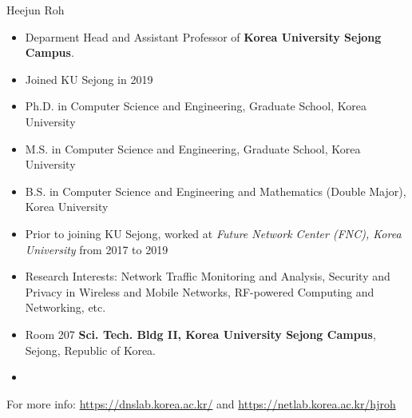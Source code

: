 \begin{frame}{Heejun Roh}
  \begin{itemize}
  \item Deparment Head and Assistant Professor of {\bf Korea University Sejong Campus}.
  \item Joined KU Sejong in 2019
  \item Ph.D. in Computer Science and Engineering, Graduate School, Korea University
  \item M.S. in Computer Science and Engineering, Graduate School, Korea University
  \item B.S. in Computer Science and Engineering and Mathematics (Double Major), Korea University
  \item Prior to joining KU Sejong, worked at {\em Future Network Center (FNC), Korea University} from 2017 to
    2019
  \item Research Interests: Network Traffic Monitoring and Analysis, Security and Privacy in Wireless and Mobile Networks, RF-powered Computing and Networking, etc.
  \item Room 207 {\bf Sci. Tech. Bldg II, Korea University Sejong Campus}, Sejong, Republic of Korea.
  \item {}
  \end{itemize}
  For more info: {\small \url{https://dnslab.korea.ac.kr/} and \url{https://netlab.korea.ac.kr/hjroh}}
\end{frame}

